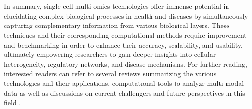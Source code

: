 \\\\
In summary, single-cell multi-omics technologies offer immense potential in elucidating complex biological processes in health and diseases by simultaneously capturing complementary information from various biological layers. These techniques and their corresponding computational methods require improvement and benchmarking in order to enhance their accuracy, scalability, and usability, ultimately empowering researchers to gain deeper insights into cellular heterogeneity, regulatory networks, and disease mechanisms. For further reading, interested readers can refer to several reviews summarizing the various technologies and their applications, computational tools to analyze multi-modal data as well as discussions on current challengers and future perspectives in this field \textbf{\cite{flynn_single-cell_2023,lee_single-cell_2020,baysoy_technological_2023, miao_multi-omics_2021, dimitriu_single-cell_2022}}. 


